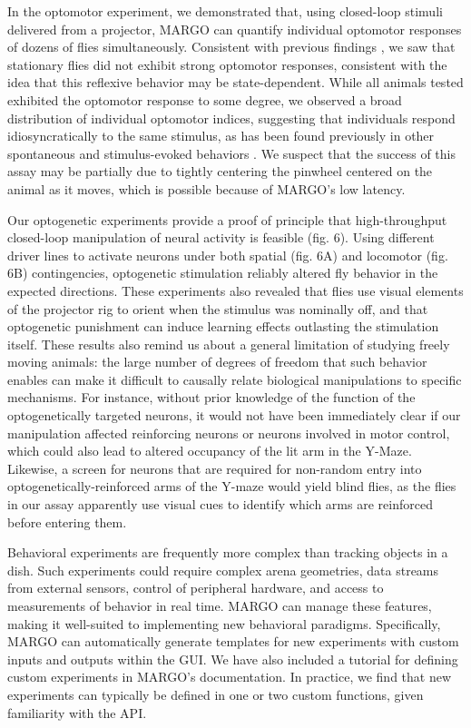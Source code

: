 \documentclass[10pt]{article}
\begin{document}
\begin{multicols}{2}
In the optomotor experiment, we demonstrated that, using closed-loop stimuli delivered from a projector, MARGO can quantify individual optomotor responses of dozens of flies simultaneously. Consistent with previous findings \cite{Zhu_Peripheral_2009,Kim_Fly_2016}, we saw that stationary flies did not exhibit strong optomotor responses, consistent with the idea that this reflexive behavior may be state-dependent\cite{Rosner_Behavioural_2009, Rien_Octopaminergic_2013, Chiappe_Walking_2010, Maimon_Active_2010,gorostiza_2018}. While all animals tested exhibited the optomotor response to some degree, we observed a broad distribution of individual optomotor indices, suggesting that individuals respond idiosyncratically to the same stimulus, as has been found previously in other spontaneous and stimulus-evoked behaviors \cite{Kain_Phototactic_2012,Kain_Leg_2013,Kain_Variability_2015,Buchanan_Neuronal_2015,Todd_Systematic_2017}. We suspect that the success of this assay may be partially due to tightly centering the pinwheel centered on the animal as it moves, which is possible because of MARGO's low latency.

Our optogenetic experiments provide a proof of principle that high-throughput closed-loop manipulation of neural activity is feasible (fig. 6). Using different driver lines to activate neurons under both spatial (fig. 6A) and locomotor (fig. 6B) contingencies, optogenetic stimulation reliably altered fly behavior in the expected directions. These experiments also revealed that flies use visual elements of the projector rig to orient when the stimulus was nominally off, and that optogenetic punishment can induce learning effects outlasting the stimulation itself. These results also remind us about a general limitation of studying freely moving animals: the large number of degrees of freedom that such behavior enables can make it difficult to causally relate biological manipulations to specific mechanisms. For instance, without prior knowledge of the function of the optogenetically targeted neurons, it would not have been immediately clear if our manipulation affected reinforcing neurons or neurons involved in motor control, which could also lead to altered occupancy of the lit arm in the Y-Maze. Likewise, a screen for neurons that are required for non-random entry into optogenetically-reinforced arms of the Y-maze would yield blind flies, as the flies in our assay apparently use visual cues to identify which arms are reinforced before entering them.

Behavioral experiments are frequently more complex than tracking objects in a dish. Such experiments could require complex arena geometries, data streams from external sensors, control of peripheral hardware, and access to measurements of behavior in real time. MARGO can manage these features, making it well-suited to implementing new behavioral paradigms. Specifically, MARGO can automatically generate templates for new experiments with custom inputs and outputs within the GUI. We have also included a tutorial for defining custom experiments in MARGO's documentation. In practice, we find that new experiments can typically be defined in one or two custom functions, given familiarity with the API.


\end{multicols}
\end{document}
